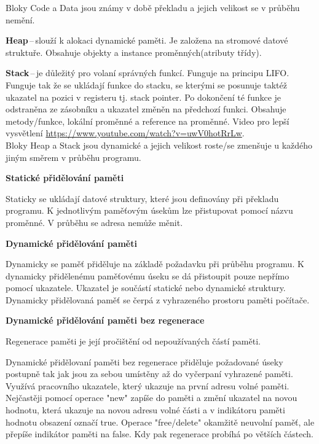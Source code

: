  Bloky Code a Data jsou známy v době překladu a jejich velikost se v průběhu nemění.

\textbf{Heap}\,--\,slouží k alokaci dynamické paměti. Je založena na stromové datové struktuře. Obsahuje objekty a instance proměnných(atributy třídy).

\textbf{Stack}\,--\,je důležitý pro volaní správných funkcí. Funguje na principu LIFO. Funguje tak že se ukládají funkce do stacku, se kterými se posunuje taktéž ukazatel na pozici v registeru tj. stack pointer. Po dokončení té funkce je odstraněna ze zásobníku a ukazatel změněn na předchozí funkci. Obsahuje metody/funkce, lokální proměnné a reference na proměnné. Video pro lepší vysvětlení \url{https://www.youtube.com/watch?v=uwV0hotRrLw}.\\

 Bloky Heap a Stack jsou dynamické a jejich velikost roste/se zmenšuje u každého jiným směrem v průběhu programu.

\begin{Large}\vspace{0,5cm} \textbf{Statické přidělování paměti}
\end{Large}

 Staticky se ukládají datové struktury, které jsou definovány při překladu programu. K jednotlivým paměťovým úsekům lze přistupovat pomocí názvu proměnné. V průběhu se adresa nemůže měnit.

\begin{Large}\vspace{0,5cm} \textbf{Dynamické přidělování paměti}
\end{Large}

 Dynamicky se paměť přiděluje na základě požadavku při průběhu programu. K dynamicky přidělenému paměťovému úseku se dá přistoupit pouze nepřímo pomocí ukazatele. Ukazatel je součástí statické nebo dynamické struktury. Dynamicky přidělovaná paměť se čerpá z vyhrazeného prostoru paměti počítače.

\begin{Large}\vspace{0,5cm} \textbf{Dynamické přidělování paměti bez regenerace}
\end{Large}

 Regenerace paměti je její pročištění od nepoužívaných částí paměti.

 Dynamické přidělovaní paměti bez regenerace přiděluje požadované úseky postupně tak jak jsou za sebou umístěny až do vyčerpaní vyhrazené paměti. Využívá pracovního ukazatele, který ukazuje na první adresu volné paměti. Nejčastěji pomocí operace "new" zapíše do paměti a změní ukazatel na novou hodnotu, která ukazuje na novou adresu volné části a v indikátoru paměti hodnotu obsazení označí true. Operace "free/delete" okamžitě neuvolní paměť, ale přepíše indikátor paměti na false. Kdy pak regenerace probíhá po větších částech. 

